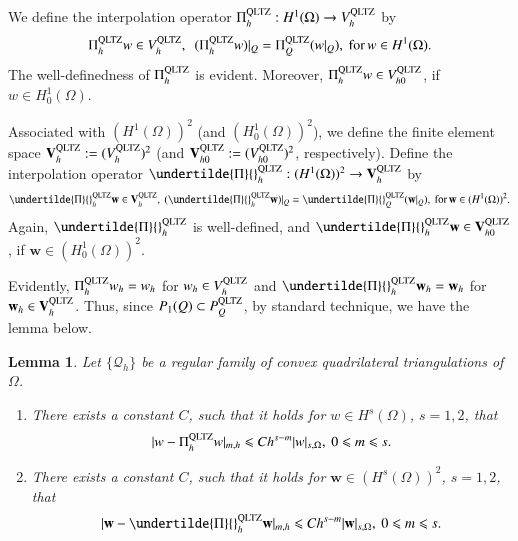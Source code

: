 \documentclass[12pt,showkeys]{amsart}
\newtheorem{lemma}[theorem]{Lemma}
\begin{document}
We define the interpolation operator $\Pi_h^{\rm QLTZ}:H^1(\Omega)\to V_h^{\rm QLTZ}$ by 
$$
\Pi_h^{\rm QLTZ}w\in V_h^{\rm QLTZ},\ \ (\Pi_h^{\rm QLTZ}w)|_Q=\Pi_Q^{\rm QLTZ}(w|_Q), \ \mbox{for}\,w\in H^1(\Omega).
$$
The well-definedness of $\Pi_h^{\rm QLTZ}$ is evident. Moreover, $\Pi_h^{\rm QLTZ}w\in V_{h0}^{\rm QLTZ}$, if $w\in H^1_0(\Omega)$.

Associated with $(H^1(\Omega))^2$ (and $(H^1_0(\Omega))^2$), we define the finite element space $\mathbf{V}_h^{\rm QLTZ}:=(V_h^{\rm QLTZ})^2$ (and $\mathbf{V}_{h0}^{\rm QLTZ}:=(V_{h0}^{\rm QLTZ})^2$, respectively). Define the interpolation operator $\undertilde{\Pi}{}_h^{\rm QLTZ}:(H^1(\Omega))^2\to\mathbf{V}_h^{\rm QLTZ}$ by
$$
\undertilde{\Pi}{}_h^{\rm QLTZ}\mathbf{w}\in \mathbf{V}_h^{\rm QLTZ},\ (\undertilde{\Pi}{}_h^{\rm QLTZ}\mathbf{w})|_Q=\undertilde{\Pi}{}_Q^{\rm QLTZ}(\mathbf{w}|_Q),\ \mbox{for}\,\mathbf{w}\in (H^1(\Omega))^2.
$$
Again, $\undertilde{\Pi}{}_h^{\rm QLTZ}$ is well-defined, and $\undertilde{\Pi}{}_h^{\rm QLTZ}\mathbf{w}\in\mathbf{V}_{h0}^{\rm QLTZ}$, if $\mathbf{w}\in (H^1_0(\Omega))^2$. 

Evidently, $\Pi_h^{\rm QLTZ}w_h=w_h$ for $w_h\in V_h^{\rm QLTZ}$ and $\undertilde{\Pi}{}_h^{\rm QLTZ}\mathbf{w}_h=\mathbf{w}_h$ for $\mathbf{w}_h\in \mathbf{V}_h^{\rm QLTZ}$. Thus, since $P_1(Q)\subset P_Q^{\rm QLTZ}$, by standard technique\cite{Lin.Q;Tobiska.L;Zhou.A2005,Shi.Z;Wang.M2013mono,Wang.M;Shi.Z;Xu.J2007,Park.C;Sheen.D2013}, we have the lemma below.
{
\begin{lemma}\label{lem:interr}
Let $\{\mathcal{Q}_h\}$ be a regular family of convex quadrilateral triangulations of $\Omega$. 
\begin{enumerate}
\item There exists a constant $C$, such that it holds for $w\in H^s(\Omega)$, $s=1,2$, that 
$$
|w-\Pi_h^{\rm QLTZ}w|_{m,h}\leqslant Ch^{s-m}|w|_{s,\Omega},\ 0\leqslant m\leqslant s.
$$
\item There exists a constant $C$, such that it holds for $\mathbf{w}\in (H^s(\Omega))^2$, $s=1,2$, that 
$$
|\mathbf{w}-\undertilde{\Pi}{}_h^{\rm QLTZ}\mathbf{w}|_{m,h}\leqslant Ch^{s-m}|\mathbf{w}|_{s,\Omega},\ 0\leqslant m\leqslant s.
$$
\end{enumerate}
\end{lemma}
}
\end{document}
